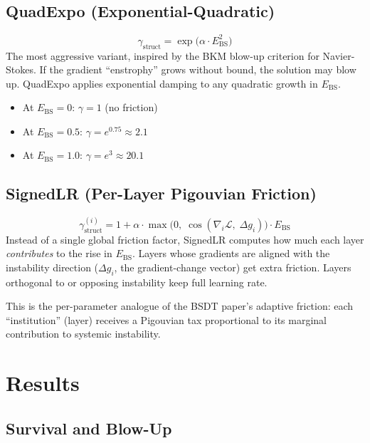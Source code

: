 \documentclass[11pt,a4paper]{article}
\begin{document}
\subsection{QuadExpo (Exponential-Quadratic)}
\[
  \gamma_{\mathrm{struct}} = \exp\!\bigl(\alpha \cdot E_{\mathrm{BS}}^2\bigr)
\]
The most aggressive variant, inspired by the BKM blow-up criterion for Navier-Stokes.
If the gradient ``enstrophy'' grows without bound, the solution may blow up.
QuadExpo applies exponential damping to any quadratic growth in $E_{\mathrm{BS}}$.
\begin{itemize}[nosep]
  \item At $E_{\mathrm{BS}} = 0$: $\gamma = 1$ (no friction)
  \item At $E_{\mathrm{BS}} = 0.5$: $\gamma = e^{0.75} \approx 2.1$
  \item At $E_{\mathrm{BS}} = 1.0$: $\gamma = e^{3} \approx 20.1$
\end{itemize}

\subsection{SignedLR (Per-Layer Pigouvian Friction)}
\[
  \gamma_{\mathrm{struct}}^{(i)} = 1 + \alpha \cdot \max\!\bigl(0, \; \cos(\nabla_i \mathcal{L}, \; \Delta g_i)\bigr) \cdot E_{\mathrm{BS}}
\]
Instead of a single global friction factor, SignedLR computes how much each layer \emph{contributes} to the rise in $E_{\mathrm{BS}}$.  Layers whose gradients are aligned with the instability direction ($\Delta g_i$, the gradient-change vector) get extra friction.  Layers orthogonal to or opposing instability keep full learning rate.

This is the per-parameter analogue of the BSDT paper's adaptive friction:
each ``institution'' (layer) receives a Pigouvian tax proportional to its
marginal contribution to systemic instability.

\section{Results}

\subsection{Survival and Blow-Up}
\end{document}
